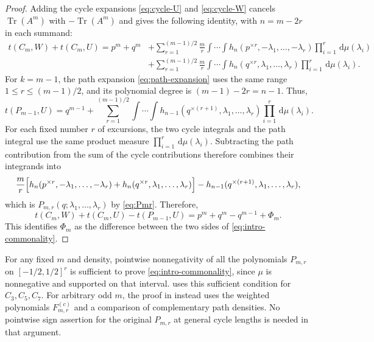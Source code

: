 \documentclass[11pt]{article}
\numberwithin{equation}{section}
\newcommand{\Tr}{\operatorname{Tr}}
\newcommand{\dd}{\,\mathrm d}
\newcommand{\tC}[2]{t(C_{#1},#2)}
\newcommand{\tP}[2]{t(P_{#1},#2)}
\newcommand{\rep}[2]{#1^{\times #2}}
\begin{document}
\begin{proof}
  Adding the cycle expansions \eqref{eq:cycle-U} and
  \eqref{eq:cycle-W} cancels $\Tr(A^m)$ with $-\Tr(A^m)$ and gives the
  following identity, with $n=m-2r$ in each summand:
  \[
    \begin{aligned}
      \tC mW+\tC mU
      ={}p^m+q^m
      &+\sum_{r=1}^{(m-1)/2}\frac mr
      \int\!\cdots\!\int
        h_n(\rep pr,-\lambda_1,\ldots,-\lambda_r)
      \prod_{i=1}^r\dd\mu(\lambda_i)\\
      &+\sum_{r=1}^{(m-1)/2}\frac mr
      \int\!\cdots\!\int
        h_n(\rep qr,\lambda_1,\ldots,\lambda_r)
      \prod_{i=1}^r\dd\mu(\lambda_i).
    \end{aligned}
  \]
  For $k=m-1$, the path expansion \eqref{eq:path-expansion} uses the
  same range $1\le r\le(m-1)/2$, and its polynomial degree is
  $(m-1)-2r=n-1$. Thus,
  \[
    \tP{m-1}U=q^{m-1}+
    \sum_{r=1}^{(m-1)/2}
      \int\!\cdots\!\int
      h_{n-1}(\rep q{(r+1)},\lambda_1,\ldots,\lambda_r)
      \prod_{i=1}^r\dd\mu(\lambda_i).
  \]
  For each fixed number $r$ of excursions, the two cycle integrals and
  the path integral use the same product measure
  $\prod_{i=1}^r\dd\mu(\lambda_i)$.
  Subtracting the path contribution from the sum of the cycle
  contributions therefore combines their integrands into
  \[
    \frac mr\Bigl[
      h_n(\rep pr,-\lambda_1,\ldots,-\lambda_r)
      +h_n(\rep qr,\lambda_1,\ldots,\lambda_r)
    \Bigr]
    -h_{n-1}(\rep q{(r+1)},\lambda_1,\ldots,\lambda_r),
  \]
  which is $P_{m,r}(q;\lambda_1,\ldots,\lambda_r)$ by
  \eqref{eq:Pmr}.  Therefore,
  \begin{equation}\label{eq:commonality-gap}
    \tC mW+\tC mU-\tP{m-1}U
    =p^m+q^m-q^{m-1}+\Phi_m.
  \end{equation}
  This identifies $\Phi_m$ as the
  difference between the two sides of \eqref{eq:intro-commonality}.
\end{proof}

For any fixed $m$ and density, pointwise nonnegativity of all the
polynomials $P_{m,r}$ on $[-1/2,1/2]^r$ is sufficient to prove
\eqref{eq:intro-commonality}, since $\mu$ is nonnegative and supported
on that interval.  uses this sufficient
condition for $C_3,C_5,C_7$. For arbitrary odd $m$, the proof in
 instead uses the weighted polynomials
$F^{(c)}_{m,r}$ and a comparison of complementary path densities.
No pointwise sign assertion for the original $P_{m,r}$ at general
cycle lengths is needed in that argument.
\end{document}
